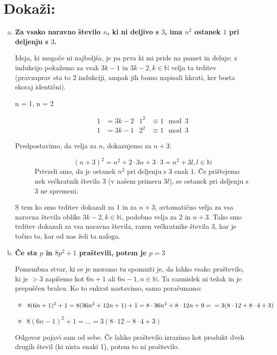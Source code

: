 \documentclass[12pt,a4paper,slovene]{article}
\begin{document}
\section{Dokaži:}
\begin{enumerate}[a)]
    \item \textbf{Za vsako naravno število $n$, ki ni deljivo s $3$, ima $n^2$ ostanek $1$ pri deljenju s $3$.}
    
    Ideja, ki mogoče ni najboljša, je pa prva ki mi pride na pamet in deluje: z indukcijo pokažemo za vsak $3k - 1$ in $3k - 2, k\in\mathbb{N}$ velja ta trditev (pravzaprav sta to 2 indukciji, ampak jih bomo napisali hkrati, ker bosta skoraj identični).
    \begin{description}
        \item [n = 1, n = 2]
        \begin{align*}
            1 &= 3k - 2 & 1^2 &\equiv 1 \mod{3}\\
            1 &= 3k - 1	& 2^2 &\equiv 1 \mod{3}
        \end{align*}
        \item[Predpostavimo, da velja za $n$, dokazujemo za $n+3$:]
        \[
            (n + 3)^2 = n^2 + 2\cdot 3 n + 3\cdot 3 = n^2 + 3l, l \in\mathbb{N}  
        \]
        Privzeli smo, da je ostanek $n^2$ pri deljenju s $3$ enak $1$. Če prištejemo nek večkratnik števila 3 (v našem primeru $3l$), se ostanek pri deljenju s 3 ne spremeni.
    \end{description}
    S tem ko smo trditev dokazali za $1$ in za $n+3$, avtomatično velja za vsa naravna števila oblike $3k - 2, k\in\mathbb{N}$, podobno velja za $2$ in $n + 3$. Tako smo trditev dokazali za vsa naravna števila, razen večkratnike števila $3$, kar je točno to, kar od nas želi ta naloga.
    
    \item \textbf{Če sta $p$ in $8p^2 + 1$ praštevili, potem je $p = 3$}
    
    Pomembna stvar, ki se je moramo tu spomniti je, da lahko vsako praštevilo, ki je $> 3$ zapišemo kot $6n + 1$ ali $6n - 1, n\in\mathbb{N}$. Ta razmislek ni težak in je prepuščen bralcu. Ko to enkrat nastavimo, samo poračunamo:
    \begin{itemize}
        \item $8 (6n + 1)^2 + 1 = 8 (36n^2 + 12n + 1) + 1 = 8\cdot 36n^2 + 8\cdot 12 n + 9 =\\= 3 (8\cdot 12 + 8\cdot 4 + 3)$
        \item $8 (6n - 1)^2 + 1 = \ldots = 3 (8\cdot 12 - 8\cdot 4 + 3)$
    \end{itemize}    
    Odgovor pojavi sam od sebe. Če lahko praštevilo izrazimo kot produkt dveh drugih števil (ki nista enaki 1), potem to ni praštevilo.
    

\end{enumerate}
\end{document}
